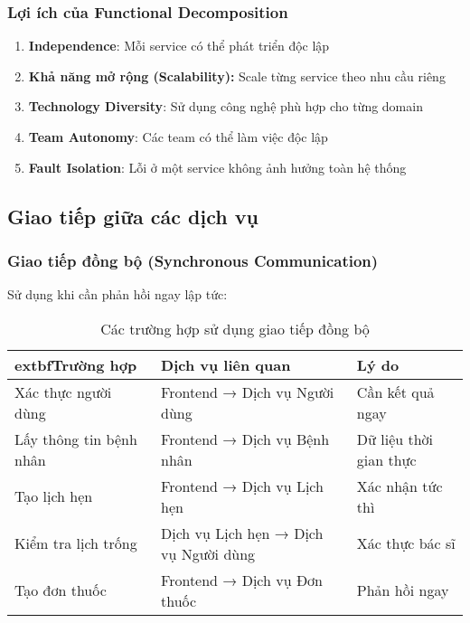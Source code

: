 \documentclass[12pt,a4paper]{report}
\begin{document}
    \subsubsection{Lợi ích của Functional Decomposition}
    \begin{enumerate}
        \item \textbf{Independence}: Mỗi service có thể phát triển độc lập
        \item \textbf{Khả năng mở rộng (Scalability):} Scale từng service theo nhu cầu riêng
        \item \textbf{Technology Diversity}: Sử dụng công nghệ phù hợp cho từng domain
        \item \textbf{Team Autonomy}: Các team có thể làm việc độc lập
        \item \textbf{Fault Isolation}: Lỗi ở một service không ảnh hưởng toàn hệ thống
    \end{enumerate}

    \subsection{Giao tiếp giữa các dịch vụ}

    \subsubsection{Giao tiếp đồng bộ (Synchronous Communication)}
    Sử dụng khi cần phản hồi ngay lập tức:

    \begin{table}[h]
    \centering
    \caption{Các trường hợp sử dụng giao tiếp đồng bộ}
    \begin{tabular}{|l|l|l|}
    \hline
    	extbf{Trường hợp} & \textbf{Dịch vụ liên quan} & \textbf{Lý do} \\
    \hline
    Xác thực người dùng & Frontend → Dịch vụ Người dùng & Cần kết quả ngay \\
    \hline
    Lấy thông tin bệnh nhân & Frontend → Dịch vụ Bệnh nhân & Dữ liệu thời gian thực \\
    \hline
    Tạo lịch hẹn & Frontend → Dịch vụ Lịch hẹn & Xác nhận tức thì \\
    \hline
    Kiểm tra lịch trống & Dịch vụ Lịch hẹn → Dịch vụ Người dùng & Xác thực bác sĩ \\
    \hline
    Tạo đơn thuốc & Frontend → Dịch vụ Đơn thuốc & Phản hồi ngay \\
    \hline
    \end{tabular}
    \end{table}
\end{document}

